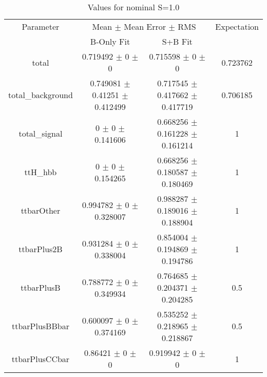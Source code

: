 \begin{table}
\centering
\caption{Values for nominal S=1.0}
\begin{tabular}{cccc}
\toprule
Parameter & \multicolumn{2}{c}{Mean $\pm$ Mean Error $\pm$ RMS} & Expectation\\
 & B-Only Fit & S+B Fit & \\
\midrule
total & \num{0.719492} $\pm$ \num{0} $\pm$ \num{0} & \num{0.715598} $\pm$ \num{0} $\pm$ \num{0} & \num{0.723762}\\
total\_background & \num{0.749081} $\pm$ \num{0.41251} $\pm$ \num{0.412499} & \num{0.717545} $\pm$ \num{0.417662} $\pm$ \num{0.417719} & \num{0.706185}\\
total\_signal & \num{0} $\pm$ \num{0} $\pm$ \num{0.141606} & \num{0.668256} $\pm$ \num{0.161228} $\pm$ \num{0.161214} & \num{1}\\
ttH\_hbb & \num{0} $\pm$ \num{0} $\pm$ \num{0.154265} & \num{0.668256} $\pm$ \num{0.180587} $\pm$ \num{0.180469} & \num{1}\\
ttbarOther & \num{0.994782} $\pm$ \num{0} $\pm$ \num{0.328007} & \num{0.988287} $\pm$ \num{0.189016} $\pm$ \num{0.188904} & \num{1}\\
ttbarPlus2B & \num{0.931284} $\pm$ \num{0} $\pm$ \num{0.338004} & \num{0.854004} $\pm$ \num{0.194869} $\pm$ \num{0.194786} & \num{1}\\
ttbarPlusB & \num{0.788772} $\pm$ \num{0} $\pm$ \num{0.349934} & \num{0.764685} $\pm$ \num{0.204371} $\pm$ \num{0.204285} & \num{0.5}\\
ttbarPlusBBbar & \num{0.600097} $\pm$ \num{0} $\pm$ \num{0.374169} & \num{0.535252} $\pm$ \num{0.218965} $\pm$ \num{0.218867} & \num{0.5}\\
ttbarPlusCCbar & \num{0.86421} $\pm$ \num{0} $\pm$ \num{0} & \num{0.919942} $\pm$ \num{0} $\pm$ \num{0} & \num{1}\\
\bottomrule
\end{tabular}
\end{table}